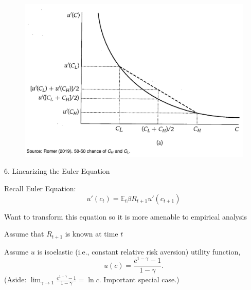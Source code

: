 \documentclass[11pt, aspectratio=169]{beamer}
\newenvironment{witemize}{\itemize\addtolength{\itemsep}{10pt}}{\enditemize}
\begin{document}
\begin{frame}{}
	\begin{figure}
		\includegraphics[scale=0.3]{./figures/precautionary}
	\end{figure}
\end{frame}



\begin{frame}{6. Linearizing the Euler Equation}

\begin{witemize}
\item Recall Euler Equation: 
\begin{equation*}
	u'(c_t) = \mathbb E_t \beta R_{t+1} u'(c_{t+1}) 
\end{equation*}

\item Want to transform this equation so it is more amenable to empirical analysis

\item Assume that $R_{t+1}$ is known at time $t$

\item Assume $u$ is isoelastic (i.e., constant relative risk aversion) utility
function, 
\begin{equation*}
	u(c) = \frac{c^{1-\gamma}-1}{1-\gamma}. 
\end{equation*}
(Aside: $\lim_{\gamma \rightarrow 1}\frac{c^{1-\gamma }-1}{1-\gamma }=\ln c$. Important special case.)

\end{witemize}
\end{frame}
\end{document}
